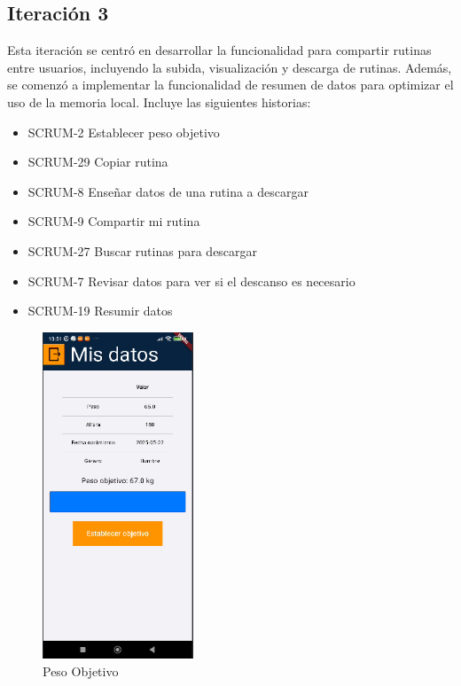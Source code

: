 \subsection{Iteración 3}
Esta iteración se centró en desarrollar la funcionalidad para compartir rutinas entre usuarios, incluyendo la subida, visualización y descarga de rutinas. Además, se comenzó a implementar la funcionalidad de resumen de datos para optimizar el uso de la memoria local. Incluye las siguientes historias:

\begin{itemize}
  \item SCRUM-2 Establecer peso objetivo
  \item SCRUM-29 Copiar rutina
  \item SCRUM-8 Enseñar datos de una rutina a descargar
  \item SCRUM-9 Compartir mi rutina
  \item SCRUM-27 Buscar rutinas para descargar
  \item SCRUM-7 Revisar datos para ver si el descanso es necesario
  \item SCRUM-19 Resumir datos
\end{itemize}


\begin{figure}[H]
   \centering
    \includegraphics[width=0.4\textwidth]{pantallas/pesoObj.png}
    \caption{Peso Objetivo}
    \label{fig:pesoObj}
\end{figure}

